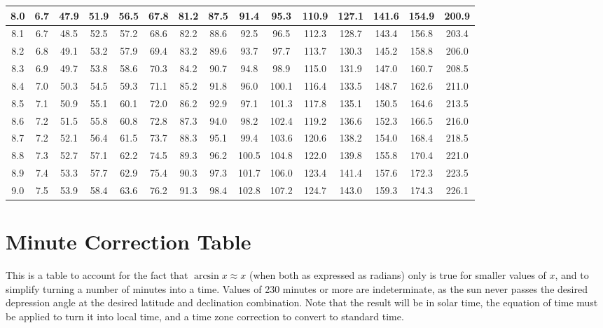 \begin{footnotesize}
\begin{tabular}{c | c | c | c | c | c | c | c | c | c | c | c | c | c | c}
		8.0&6.7&47.9&51.9&56.5&67.8&81.2&87.5&91.4&95.3&110.9&127.1&141.6&154.9&200.9\\\hline
		8.1&6.7&48.5&52.5&57.2&68.6&82.2&88.6&92.5&96.5&112.3&128.7&143.4&156.8&203.4\\\hline
		8.2&6.8&49.1&53.2&57.9&69.4&83.2&89.6&93.7&97.7&113.7&130.3&145.2&158.8&206.0\\\hline
		8.3&6.9&49.7&53.8&58.6&70.3&84.2&90.7&94.8&98.9&115.0&131.9&147.0&160.7&208.5\\\hline
		8.4&7.0&50.3&54.5&59.3&71.1&85.2&91.8&96.0&100.1&116.4&133.5&148.7&162.6&211.0\\\hline
		8.5&7.1&50.9&55.1&60.1&72.0&86.2&92.9&97.1&101.3&117.8&135.1&150.5&164.6&213.5\\\hline
		8.6&7.2&51.5&55.8&60.8&72.8&87.3&94.0&98.2&102.4&119.2&136.6&152.3&166.5&216.0\\\hline
		8.7&7.2&52.1&56.4&61.5&73.7&88.3&95.1&99.4&103.6&120.6&138.2&154.0&168.4&218.5\\\hline
		8.8&7.3&52.7&57.1&62.2&74.5&89.3&96.2&100.5&104.8&122.0&139.8&155.8&170.4&221.0\\\hline
		8.9&7.4&53.3&57.7&62.9&75.4&90.3&97.3&101.7&106.0&123.4&141.4&157.6&172.3&223.5\\\hline
		9.0&7.5&53.9&58.4&63.6&76.2&91.3&98.4&102.8&107.2&124.7&143.0&159.3&174.3&226.1\\\hline
\end{tabular}\end{footnotesize}

\section{Minute Correction Table}

This is a table to account for the fact that $\arcsin x \approx x$ (when both as expressed as radians) only is true for smaller values of $x$, and to simplify turning a number of minutes into a time. Values of 230 minutes or more are indeterminate, as the sun never passes the desired depression angle at the desired latitude and declination combination. Note that the result will be in solar time, the equation of time must be applied to turn it into local time, and a time zone correction to convert to standard time.

